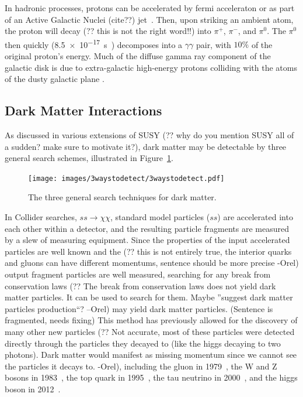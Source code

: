   In hadronic processes, protons can be accelerated by fermi acceleraton or as part of an {\color{red}Active Galactic Nuclei (cite??)} jet~\cite{hadronic1,hadronic2}.
  Then, upon striking an ambient atom, the proton will {\color{red}decay (?? this is not the right word!!)} into $\pi^{+}$, $\pi^{-}$, and $\pi^{0}$.
  The $\pi^{0}$ then quickly (\SI{8.5e-17}{s}~\cite{pdg2016}) decomposes into a $\gamma\gamma$ pair, with \nicetilde$10\%$ of the original proton's energy.
  Much of the diffuse gamma ray component of the galactic disk is due to extra-galactic high-energy protons colliding with the atoms of the dusty galactic plane \cite{GalacticDiffuseGammaRays}.

  \subsection{Dark Matter Interactions}\label{dmgammaproduction}
    {\color{red}As discussed in various extensions of SUSY (?? why do you mention SUSY all of a sudden? make sure to motivate it?)}, dark matter may be detectable by three general search schemes, illustrated in Figure~\ref{fig:3_searches}.

    \begin{figure}[ht]
      \centering
      \texttt{[image: images/3waystodetect/3waystodetect.pdf]}
      \caption[3 Search Techniques]{
        The three general search techniques for dark matter.}
      \label{fig:3_searches}
    \end{figure}

    In Collider searches, $ss \rightarrow \chi\chi$, standard model particles ($ss$) are accelerated into each other within a detector, and the resulting particle fragments are measured by a slew of measuring equipment.
    {\color{red}Since the properties of the input accelerated particles are well known and the (?? this is not entirely true, the interior quarks and gluons can have different momentums, sentence should be more precise -Orel)} output fragment particles are well measured, searching for any break from {\color{red}conservation laws (?? The break from conservation laws does not yield dark matter particles. It can be used to search for them. Maybe ''suggest dark matter particles production``? --Orel)} may yield dark matter particles. {\color{red}(Sentence is fragmented, needs fixing)}
    {\color{red}This method has previously allowed for the discovery of many other new particles (?? Not accurate, most of these particles were detected directly through the particles they decayed to (like the higgs decaying to two photons). Dark matter would manifest as missing momentum since we cannot see the particles it decays to. -Orel)}, including the gluon in 1979~\cite{gluon_discovery}, the W and Z bosons in 1983~\cite{WZ_discovery1,WZ_discovery2}, the top quark in 1995~\cite{top_discovery}, the tau neutrino in 2000~\cite{tau_neutrino_discovery}, and the higgs boson in 2012~\cite{Higgs_ATLAS,Higgs_CMS}.


